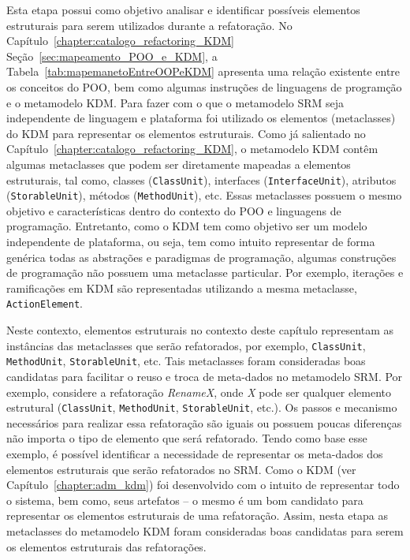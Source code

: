Esta etapa possui como objetivo analisar e identificar possíveis elementos estruturais para serem utilizados durante a refatoração. No Capítulo~\ref{chapter:catalogo_refactoring_KDM} Seção~\ref{sec:mapeamento_POO_e_KDM}, a Tabela~\ref{tab:mapemanetoEntreOOPeKDM} apresenta uma relação existente entre os conceitos do POO, bem como algumas instruções de linguagens de programção e o metamodelo KDM. Para fazer com o que o metamodelo SRM seja independente de linguagem e plataforma foi utilizado os elementos (metaclasses) do KDM para representar os elementos estruturais. Como já salientado no Capítulo~\ref{chapter:catalogo_refactoring_KDM}, o metamodelo KDM contêm algumas metaclasses que podem ser diretamente mapeadas a elementos estruturais, tal como, classes (\texttt{ClassUnit}), interfaces (\texttt{InterfaceUnit}), atributos (\texttt{StorableUnit}), métodos (\texttt{MethodUnit}), etc. Essas metaclasses possuem o mesmo objetivo e características dentro do contexto do POO e linguagens de programação. Entretanto, como o KDM tem como objetivo ser um modelo independente de plataforma, ou seja, tem como intuito representar de forma genérica todas as abstrações e paradigmas de programação, algumas construções de programação não possuem uma metaclasse particular. Por exemplo, iterações e ramificações em KDM são representadas utilizando a mesma metaclasse, \texttt{ActionElement}.

Neste contexto, elementos estruturais no contexto deste capítulo representam as instâncias das metaclasses que serão refatorados, por exemplo, \texttt{ClassUnit}, \texttt{MethodUnit}, \texttt{StorableUnit}, etc. Tais metaclasses foram consideradas boas candidatas para facilitar o reuso e troca de meta-dados no metamodelo SRM. Por exemplo, considere a refatoração \textit{RenameX}, onde \textit{X} pode ser qualquer elemento estrutural (\texttt{ClassUnit}, \texttt{MethodUnit}, \texttt{StorableUnit}, etc.). Os passos e mecanismo necessários para realizar essa refatoração são iguais ou possuem poucas diferenças não importa o tipo de elemento que será refatorado. Tendo como base esse exemplo, é possível identificar a necessidade de representar os meta-dados dos elementos estruturais que serão refatorados no SRM. Como o KDM (ver Capítulo~\ref{chapter:adm_kdm}) foi desenvolvido com o intuito de representar todo o sistema, bem como, seus artefatos – o mesmo é um bom candidato para representar os elementos estruturais de uma refatoração. Assim, nesta etapa as metaclasses do metamodelo KDM foram consideradas boas candidatas para serem os elementos estruturais das refatorações.

